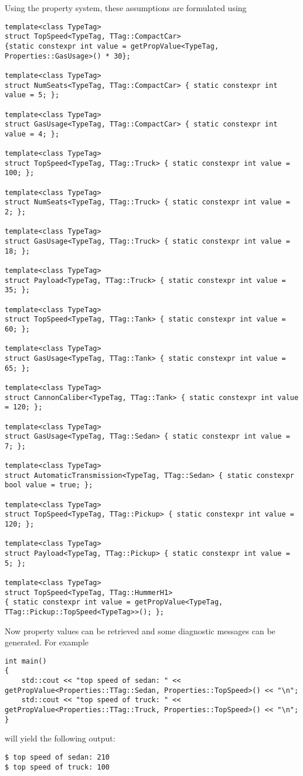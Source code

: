 \noindent
Using the \Dumux property system, these assumptions are formulated
using
\begin{lstlisting}[name=propsyscars,style=DumuxCode]
template<class TypeTag>
struct TopSpeed<TypeTag, TTag::CompactCar>
{static constexpr int value = getPropValue<TypeTag, Properties::GasUsage>() * 30};

template<class TypeTag>
struct NumSeats<TypeTag, TTag::CompactCar> { static constexpr int value = 5; };

template<class TypeTag>
struct GasUsage<TypeTag, TTag::CompactCar> { static constexpr int value = 4; };

template<class TypeTag>
struct TopSpeed<TypeTag, TTag::Truck> { static constexpr int value = 100; };

template<class TypeTag>
struct NumSeats<TypeTag, TTag::Truck> { static constexpr int value = 2; };

template<class TypeTag>
struct GasUsage<TypeTag, TTag::Truck> { static constexpr int value = 18; };

template<class TypeTag>
struct Payload<TypeTag, TTag::Truck> { static constexpr int value = 35; };

template<class TypeTag>
struct TopSpeed<TypeTag, TTag::Tank> { static constexpr int value = 60; };

template<class TypeTag>
struct GasUsage<TypeTag, TTag::Tank> { static constexpr int value = 65; };

template<class TypeTag>
struct CannonCaliber<TypeTag, TTag::Tank> { static constexpr int value = 120; };

template<class TypeTag>
struct GasUsage<TypeTag, TTag::Sedan> { static constexpr int value = 7; };

template<class TypeTag>
struct AutomaticTransmission<TypeTag, TTag::Sedan> { static constexpr bool value = true; };

template<class TypeTag>
struct TopSpeed<TypeTag, TTag::Pickup> { static constexpr int value = 120; };

template<class TypeTag>
struct Payload<TypeTag, TTag::Pickup> { static constexpr int value = 5; };

template<class TypeTag>
struct TopSpeed<TypeTag, TTag::HummerH1>
{ static constexpr int value = getPropValue<TypeTag, TTag::Pickup::TopSpeed<TypeTag>>(); };
\end{lstlisting}

\noindent
Now property values can be retrieved and some diagnostic messages can
be generated. For example
\begin{lstlisting}[name=propsyscars,style=DumuxCode]
int main()
{
    std::cout << "top speed of sedan: " << getPropValue<Properties::TTag::Sedan, Properties::TopSpeed>() << "\n";
    std::cout << "top speed of truck: " << getPropValue<Properties::TTag::Truck, Properties::TopSpeed>() << "\n";
}
\end{lstlisting}
will yield the following output:
\begin{lstlisting}[style=Bash, basicstyle=\ttfamily\scriptsize\let\textcolor\textcolordummy]
$ top speed of sedan: 210
$ top speed of truck: 100
\end{lstlisting}
